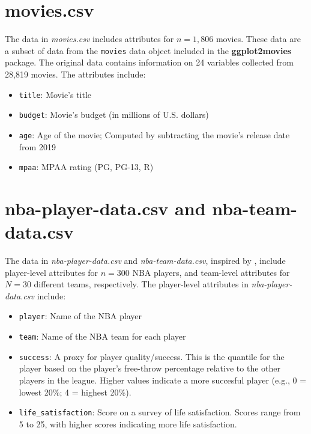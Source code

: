 \documentclass[]{book}
\providecommand{\tightlist}{%
  \setlength{\itemsep}{0pt}\setlength{\parskip}{0pt}}
\begin{document}
\hypertarget{movies}{%
\section*{movies.csv}\label{movies}}

The data in \emph{movies.csv} includes attributes for \(n=1,806\) movies. These data are a subset of data from the \texttt{movies} data object included in the \textbf{ggplot2movies} package. The original data contains information on 24 variables collected from 28,819 movies. The attributes include:

\begin{itemize}
\tightlist
\item
  \texttt{title}: Movie's title
\item
  \texttt{budget}: Movie's budget (in millions of U.S. dollars)
\item
  \texttt{age}: Age of the movie; Computed by subtracting the movie's release date from 2019
\item
  \texttt{mpaa}: MPAA rating (PG, PG-13, R)
\end{itemize}

\hypertarget{nba}{%
\section*{nba-player-data.csv and nba-team-data.csv}\label{nba}}

The data in \emph{nba-player-data.csv} and \emph{nba-team-data.csv}, inspired by \citet{Woltman:2012}, include player-level attributes for \(n=300\) NBA players, and team-level attributes for \(N=30\) different teams, respectively. The player-level attributes in \emph{nba-player-data.csv} include:

\begin{itemize}
\tightlist
\item
  \texttt{player}: Name of the NBA player
\item
  \texttt{team}: Name of the NBA team for each player
\item
  \texttt{success}: A proxy for player quality/success. This is the quantile for the player based on the player's free-throw percentage relative to the other players in the league. Higher values indicate a more succesful player (e.g., 0 = lowest 20\%; 4 = highest 20\%).
\item
  \texttt{life\_satisfaction}: Score on a survey of life satisfaction. Scores range from 5 to 25, with higher scores indicating more life satisfaction.
\end{itemize}
\end{document}
